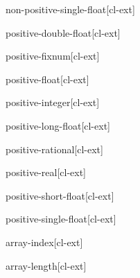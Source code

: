 \documentclass[10pt,english]{book}
\begin{document}
\begin{type}{non-positive-single-float}{}[cl-ext]
  
\end{type}

\begin{type}{positive-double-float}{}[cl-ext]
  
\end{type}

\begin{type}{positive-fixnum}{}[cl-ext]
  
\end{type}

\begin{type}{positive-float}{}[cl-ext]
  
\end{type}

\begin{type}{positive-integer}{}[cl-ext]
  
\end{type}

\begin{type}{positive-long-float}{}[cl-ext]
  
\end{type}

\begin{type}{positive-rational}{}[cl-ext]
  
\end{type}

\begin{type}{positive-real}{}[cl-ext]
  
\end{type}

\begin{type}{positive-short-float}{}[cl-ext]
  
\end{type}

\begin{type}{positive-single-float}{}[cl-ext]
  
\end{type}

\begin{type}{array-index}{}[cl-ext]
  
\end{type}

\begin{type}{array-length}{}[cl-ext]
  
\end{type}
\end{document}
